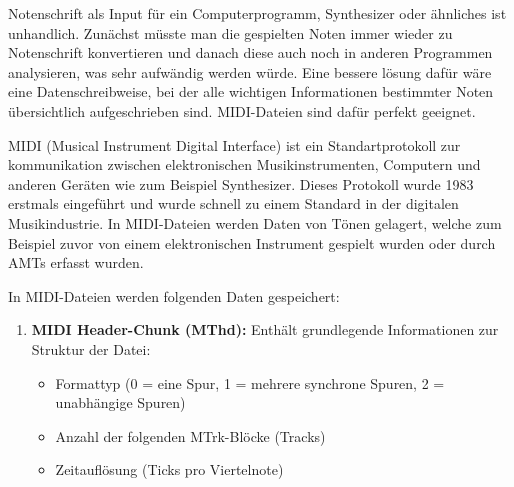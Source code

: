 \begin{description}[style=nextline]
\item[MIDI]\label{itm:midi}
Notenschrift als Input für ein Computerprogramm, Synthesizer oder ähnliches ist unhandlich.
Zunächst müsste man die gespielten Noten immer wieder zu Notenschrift konvertieren
und danach diese auch noch in anderen Programmen analysieren, was sehr aufwändig werden würde.
Eine bessere lösung dafür wäre eine Datenschreibweise,
bei der alle wichtigen Informationen bestimmter Noten übersichtlich aufgeschrieben sind.
MIDI-Dateien sind dafür perfekt geeignet.

MIDI (Musical Instrument Digital Interface) ist ein Standartprotokoll zur kommunikation zwischen
elektronischen Musikinstrumenten, Computern und anderen Geräten wie zum Beispiel Synthesizer.
Dieses Protokoll wurde 1983 erstmals eingeführt und wurde schnell zu einem Standard in der digitalen Musikindustrie.
\cite{smith1983midi}
In MIDI-Dateien werden Daten von Tönen gelagert,
welche zum Beispiel zuvor von einem elektronischen Instrument gespielt wurden oder durch AMTs erfasst wurden.

In MIDI-Dateien werden folgenden Daten gespeichert:
\begin{enumerate}
    \item \textbf{MIDI Header-Chunk (MThd):} Enthält grundlegende Informationen zur Struktur der Datei:
    \begin{itemize}
        \item Formattyp (0 = eine Spur, 1 = mehrere synchrone Spuren, 2 = unabhängige Spuren)
        \item Anzahl der folgenden MTrk-Blöcke (Tracks)
        \item Zeitauflösung (Ticks pro Viertelnote)
    \end{itemize}


\end{enumerate}
\end{description}

